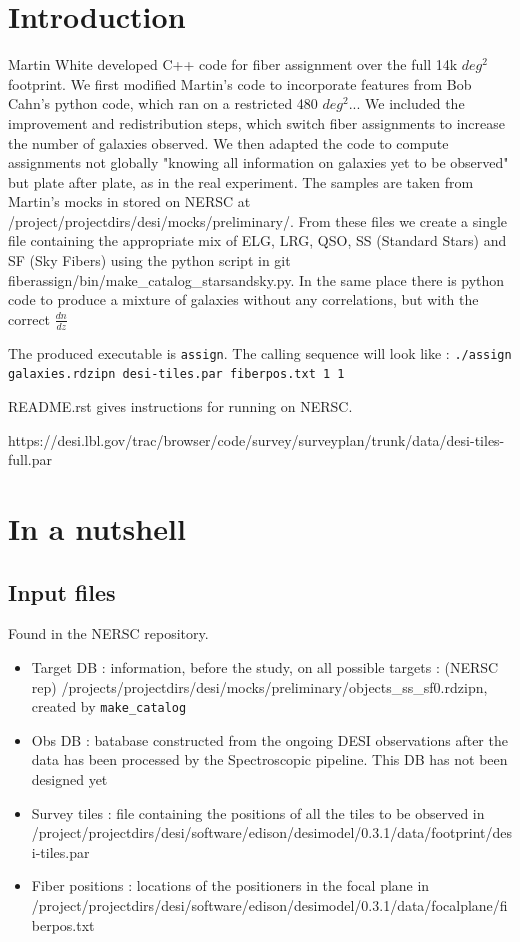 \documentclass{extarticle}
\def\sqd{$deg^{2}$}
\begin{document}
\section{Introduction}
Martin White developed C++ code for fiber assignment over the full 14k \sqd footprint.  We first modified Martin's code to incorporate features from Bob Cahn's python code, which ran on a restricted 480 \sqd... We included the improvement and redistribution steps, which switch fiber assignments to increase the number of galaxies observed. We then adapted the code to compute assignments not globally "knowing all information on galaxies yet to be observed" but plate after plate, as in the real experiment.
The samples are taken from Martin's mocks in stored on NERSC at /project/projectdirs/desi/mocks/preliminary/. From these files we create a single file containing the appropriate mix of ELG, LRG, QSO, SS (Standard Stars) and SF (Sky Fibers) using the python script in git fiberassign/bin/make\_catalog\_starsandsky.py. In the same place there is python code to produce a mixture of galaxies without any correlations, but with the correct $\frac{dn}{dz}$  
  
The produced executable is {\tt assign}. The calling sequence will look like :
{\tt./assign galaxies.rdzipn desi-tiles.par fiberpos.txt 1 1}
  
README.rst gives instructions for running on NERSC.

https://desi.lbl.gov/trac/browser/code/survey/surveyplan/trunk/data/desi-tiles-full.par
\section{In a nutshell}
\subsection{Input files}
Found in the NERSC repository.
\begin{itemize} 
	\item Target DB : information, before the study, on all possible targets : (NERSC rep) /projects/projectdirs/desi/mocks/preliminary/objects\_ss\_sf0.rdzipn, created by {\tt make\_catalog}
	\item Obs DB : batabase constructed from the ongoing DESI observations after the data has been processed by the Spectroscopic pipeline. This DB has not been designed yet
	\item Survey tiles : file containing the positions of all the tiles to be observed in /project/projectdirs/desi/software/edison/desimodel/0.3.1/data/footprint/desi-tiles.par
	\item Fiber positions : locations of the positioners in the focal plane in /project/projectdirs/desi/software/edison/desimodel/0.3.1/data/focalplane/fiberpos.txt
\end{itemize} 
\end{document}
